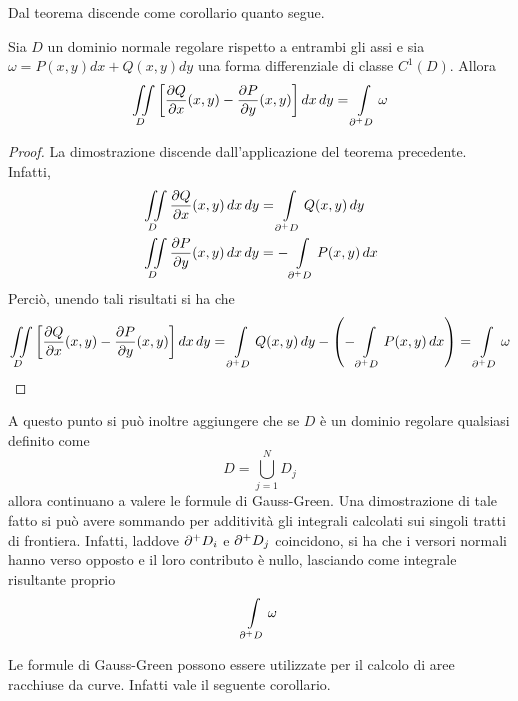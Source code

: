  Dal teorema discende come corollario quanto segue.
 \begin{corollary}
     Sia $D$ un dominio normale regolare rispetto a entrambi gli assi e sia $\omega= P(x,y)dx+ Q(x,y)dy$ una forma differenziale di classe $C^1(D)$. Allora
     \begin{equation}
         \iint\limits_{D}{\left[\frac{\partial Q}{\partial x} (x,y)- \frac{\partial P}{\partial y}(x,y)\right]}\, dx\, dy = \int\limits_{\partial^+ D} \omega
     \end{equation}
\end{corollary}
\begin{proof}
    La dimostrazione discende dall'applicazione del teorema precedente. Infatti,
    \begin{equation}
        \begin{aligned}
            &\iint\limits_{D}{\frac{\partial Q}{\partial x} (x,y)}\,dx\,dy =  \int\limits_{\partial^+ D}{Q(x,y)}\,dy\\
            &\iint\limits_{D}{\frac{\partial P}{\partial y} (x,y)}\,dx\,dy =  -\int\limits_{\partial^+ D}{P(x,y)}\,dx
        \end{aligned}
    \end{equation}
    Perciò, unendo tali risultati si ha che
    \begin{equation}
      \iint\limits_{D}{\left[\frac{\partial Q}{\partial x} (x,y)- \frac{\partial P}{\partial y}(x,y)\right]}\, dx\, dy = \int\limits_{\partial^+ D}{Q(x,y)}\,dy - \left(  -\int\limits_{\partial^+ D}{P(x,y)}\,dx\right)= \int\limits_{\partial^+ D} \omega  
    \end{equation}
\end{proof}
\begin{oss}
A questo punto si può inoltre aggiungere che se $D$ è un dominio regolare qualsiasi definito come 
\begin{equation}
    D = \bigcup_{j=1}^{N} D_j
\end{equation}
allora continuano a valere le formule di Gauss-Green. Una dimostrazione di tale fatto si può avere sommando per additività gli integrali calcolati sui singoli tratti di frontiera. Infatti, laddove $\partial^+ D_i$ e $\partial^+ D_j$ coincidono, si ha che i versori normali hanno verso opposto e il loro contributo è nullo, lasciando come integrale risultante proprio
\begin{equation}
    \int\limits_{\partial^+ D}{\omega}
\end{equation}
\end{oss}
Le formule di Gauss-Green possono essere utilizzate per il calcolo di aree racchiuse da curve. Infatti vale il seguente corollario.
